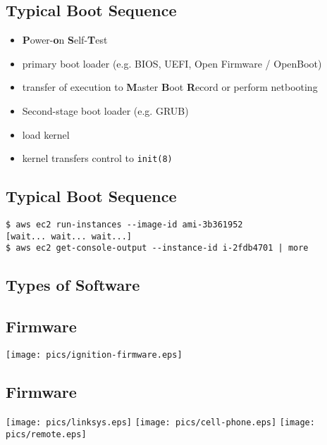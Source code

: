 \documentclass[xga]{xdvislides}
\begin{document}
\subsection{Typical Boot Sequence}
\begin{itemize}
	\item {\bf P}ower-{\bf o}n {\bf S}elf-{\bf T}est
	\item primary boot loader (e.g. BIOS, UEFI, Open Firmware / OpenBoot)
	\item transfer of execution to {\bf M}aster {\bf B}oot {\bf R}ecord or perform netbooting
	\item Second-stage boot loader (e.g. GRUB)
	\item load kernel
	\item kernel transfers control to {\tt init(8)}
\end{itemize}

\subsection{Typical Boot Sequence}
\vspace*{\fill}
\begin{verbatim}
$ aws ec2 run-instances --image-id ami-3b361952
[wait... wait... wait...]
$ aws ec2 get-console-output --instance-id i-2fdb4701 | more
\end{verbatim}
\vspace*{\fill}


\subsection{Types of Software}

\subsection{Firmware}
\begin{center}
	\texttt{[image: pics/ignition-firmware.eps]}
\end{center}

\subsection{Firmware}
\begin{center}
	\texttt{[image: pics/linksys.eps]}
	\texttt{[image: pics/cell-phone.eps]}
	\texttt{[image: pics/remote.eps]}
\end{center}
\end{document}
